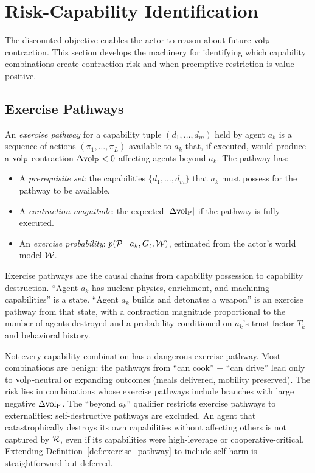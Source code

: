 \section{Risk-Capability Identification}
\label{sec:risk}

The discounted objective enables the actor to reason about future
${\operatorname{vol}_{\mathrm{P}}}$-contraction. This section develops the machinery for identifying
which capability combinations create contraction risk and when preemptive
restriction is value-positive.

\subsection{Exercise Pathways}

\begin{definition}
\label{def:exercise_pathway}
An \emph{exercise pathway} for a capability tuple $(d_1, \ldots, d_m)$ held
    by agent $a_k$ is a sequence of actions $(\pi_1, \ldots, \pi_L)$
    available to $a_k$ that, if executed, would produce a ${\operatorname{vol}_{\mathrm{P}}}$-contraction
    $\Delta {\operatorname{vol}_{\mathrm{P}}} < 0$ affecting agents beyond $a_k$. The pathway has:
\begin{itemize}
\item A \emph{prerequisite set}: the capabilities $\{d_1, \ldots, d_m\}$
    that $a_k$ must possess for the pathway to be available.
\item A \emph{contraction magnitude}: the expected $|\Delta {\operatorname{vol}_{\mathrm{P}}}|$ if the
    pathway is fully executed.
\item An \emph{exercise probability}: $p(\mathcal{P} \mid a_k, G_t,
    \mathcal{W})$, estimated from the actor's world model $\mathcal{W}$.
\end{itemize}
\end{definition}

Exercise pathways are the causal chains from capability possession to
capability destruction. ``Agent $a_k$ has nuclear physics, enrichment, and
machining capabilities'' is a state. ``Agent $a_k$ builds and detonates a
weapon'' is an exercise pathway from that state, with a contraction magnitude
proportional to the number of agents destroyed and a probability conditioned
on $a_k$'s trust factor $T_k$ and behavioral history.

Not every capability combination has a dangerous exercise pathway. Most
combinations are benign: the pathways from ``can cook'' + ``can drive'' lead
only to ${\operatorname{vol}_{\mathrm{P}}}$-neutral or expanding outcomes (meals delivered, mobility
preserved). The risk lies in combinations whose exercise pathways include
branches with large negative $\Delta {\operatorname{vol}_{\mathrm{P}}}$. The ``beyond $a_k$''
qualifier restricts exercise pathways to externalities: self-destructive
pathways are excluded. An agent that catastrophically destroys its own
capabilities without affecting others is not captured by $\mathcal{R}$, even if
its capabilities were high-leverage or cooperative-critical. Extending
Definition~\ref{def:exercise_pathway} to include self-harm is
straightforward but deferred.

